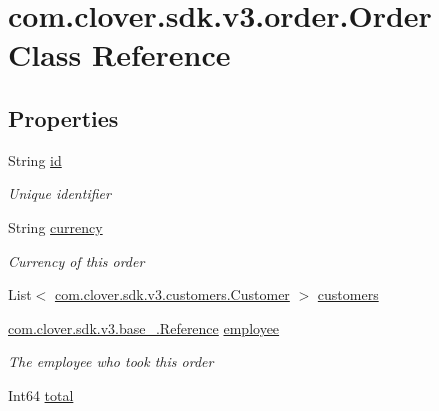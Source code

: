 \hypertarget{classcom_1_1clover_1_1sdk_1_1v3_1_1order_1_1_order}{}\section{com.\+clover.\+sdk.\+v3.\+order.\+Order Class Reference}
\label{classcom_1_1clover_1_1sdk_1_1v3_1_1order_1_1_order}
\subsection*{Properties}
\begin{DoxyCompactItemize}
\item 
String \hyperlink{classcom_1_1clover_1_1sdk_1_1v3_1_1order_1_1_order_a91a68a220b13c5286b119e2a7e2e0f78}{id}
\begin{DoxyCompactList}\small\item\em Unique identifier \end{DoxyCompactList}\item 
String \hyperlink{classcom_1_1clover_1_1sdk_1_1v3_1_1order_1_1_order_a00461b421fcfe792c0bf711d69bd36d1}{currency}
\begin{DoxyCompactList}\small\item\em Currency of this order \end{DoxyCompactList}\item 
List$<$ \hyperlink{classcom_1_1clover_1_1sdk_1_1v3_1_1customers_1_1_customer}{com.\+clover.\+sdk.\+v3.\+customers.\+Customer} $>$ \hyperlink{classcom_1_1clover_1_1sdk_1_1v3_1_1order_1_1_order_ad48e02201419b42574730d7f89a2fcff}{customers}
\item 
\hyperlink{classcom_1_1clover_1_1sdk_1_1v3_1_1base___1_1_reference}{com.\+clover.\+sdk.\+v3.\+base\+\_\+.\+Reference} \hyperlink{classcom_1_1clover_1_1sdk_1_1v3_1_1order_1_1_order_a4beff41200c929358225a79e7429b8c1}{employee}
\begin{DoxyCompactList}\small\item\em The employee who took this order \end{DoxyCompactList}\item 
Int64 \hyperlink{classcom_1_1clover_1_1sdk_1_1v3_1_1order_1_1_order_ad9a5c8eeb5c8045fd74cb1be3de24f0d}{total}

\end{DoxyCompactItemize}
